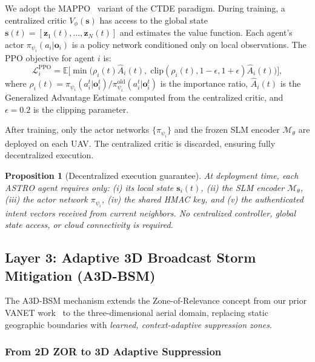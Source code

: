 \documentclass[5p,times]{elsarticle}
\newtheorem{proposition}{Proposition}[section]
\begin{document}
We adopt the MAPPO~\cite{yu2022mappo} variant of the CTDE paradigm. During training, a centralized critic $V_\phi(\mathbf{s})$ has access to the global state $\mathbf{s}(t) = [\mathbf{z}_1(t), \dots, \mathbf{z}_N(t)]$ and estimates the value function. Each agent's actor $\pi_{\psi_i}(a_i | \mathbf{o}_i)$ is a policy network conditioned only on local observations. The PPO objective for agent $i$ is:
\begin{equation}
\label{eq:ppo}
\mathcal{L}_i^{\mathrm{PPO}} = \mathbb{E}\bigg[\min\Big(\rho_i(t) \hat{A}_i(t),\; \mathrm{clip}(\rho_i(t), 1-\epsilon, 1+\epsilon)\hat{A}_i(t)\Big)\bigg],
\end{equation}
where $\rho_i(t) = \pi_{\psi_i}(a_i^t | \mathbf{o}_i^t) / \pi_{\psi_i}^{\mathrm{old}}(a_i^t | \mathbf{o}_i^t)$ is the importance ratio, $\hat{A}_i(t)$ is the Generalized Advantage Estimate computed from the centralized critic, and $\epsilon = 0.2$ is the clipping parameter.

After training, only the actor networks $\{\pi_{\psi_i}\}$ and the frozen SLM encoder $\mathcal{M}_\theta$ are deployed on each UAV. The centralized critic is discarded, ensuring fully decentralized execution.

\begin{proposition}[Decentralized execution guarantee]
\label{prop:decentralized}
At deployment time, each ASTRO agent requires only: (i) its local state $\mathbf{s}_i(t)$, (ii) the SLM encoder $\mathcal{M}_\theta$, (iii) the actor network $\pi_{\psi_i}$, (iv) the shared HMAC key, and (v) the authenticated intent vectors received from current neighbors. No centralized controller, global state access, or cloud connectivity is required.
\end{proposition}

\subsection{Layer 3: Adaptive 3D Broadcast Storm Mitigation (A3D-BSM)}
\label{subsec:a3d_bsm}

The A3D-BSM mechanism extends the Zone-of-Relevance concept from our prior VANET work~\cite{allani2018dpms} to the three-dimensional aerial domain, replacing static geographic boundaries with \emph{learned, context-adaptive suppression zones}.

\subsubsection{From 2D ZOR to 3D Adaptive Suppression}
\end{document}

